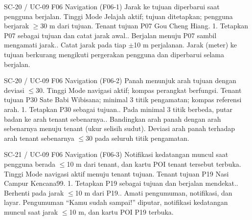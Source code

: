 \renewcommand{\tcactual}{Sesuai ekspektasi pada perangkat Android (Logika jarak lolos (\texttt{07-navigation})). Jarak (meter) ke tujuan berkurang mengikuti pergerakan pengguna dan diperbarui selama berjalan.}
{SC-20 / UC-09}
{F06 Navigation}
{(F06-1) Jarak ke tujuan diperbarui saat pengguna berjalan.}
{Tinggi}
{Mode Jelajah aktif; tujuan ditetapkan; pengguna berjarak \(\ge\)30 m dari tujuan.}
{Tenant tujuan P07 Gou Cheng Hiang.}
{1. Tetapkan P07 sebagai tujuan dan catat jarak awal.. Berjalan menuju P07 sambil mengamati jarak.. Catat jarak pada tiap \(\pm\)10 m perjalanan.}
{Jarak (meter) ke tujuan berkurang mengikuti pergerakan pengguna dan diperbarui selama berjalan.}

\renewcommand{\tcactual}{Sesuai ekspektasi pada perangkat Android (Bearing/heading lolos (\texttt{07-navigation})). Deviasi arah panah terhadap arah tenant sebenarnya \(\le\)30\textdegree{} pada seluruh titik pengamatan.}
{SC-20 / UC-09}
{F06 Navigation}
{(F06-2) Panah menunjuk arah tujuan dengan deviasi \(\le\)30\textdegree{}.}
{Tinggi}
{Mode navigasi aktif; kompas perangkat berfungsi.}
{Tenant tujuan P30 Sate Babi Wibisana; minimal 3 titik pengamatan; kompas referensi arah.}
{1. Tetapkan P30 sebagai tujuan.. Pada minimal 3 titik berbeda, putar badan ke arah tenant sebenarnya.. Bandingkan arah panah dengan arah sebenarnya menuju tenant (ukur selisih sudut).}
{Deviasi arah panah terhadap arah tenant sebenarnya \(\le\)30\textdegree{} pada seluruh titik pengamatan.}

\renewcommand{\tcactual}{Sesuai ekspektasi pada perangkat Android (Deteksi tiba \(\le\)10 m lolos (\texttt{07-navigation})). Pengumuman ``Kamu sudah sampai!'' diputar, notifikasi kedatangan muncul saat jarak \(\le\)10 m, dan kartu POI P19 terbuka.}
{SC-21 / UC-09}
{F06 Navigation}
{(F06-3) Notifikasi kedatangan muncul saat pengguna berada \(\le\)10 m dari tenant, dan kartu POI tenant tersebut terbuka.}
{Tinggi}
{Mode navigasi aktif menuju tenant tujuan.}
{Tenant tujuan P19 Nasi Campur Kencana99.}
{1. Tetapkan P19 sebagai tujuan dan berjalan mendekat.. Berhenti pada jarak \(\le\)10 m dari P19.. Amati pengumuman, notifikasi, dan layar.}
{Pengumuman ``Kamu sudah sampai!'' diputar, notifikasi kedatangan muncul saat jarak \(\le\)10 m, dan kartu POI P19 terbuka.}

